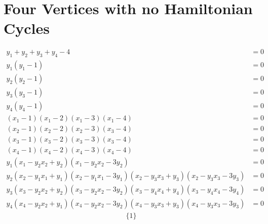 \documentclass[letterpaper]{article}
\newcommand{\aln}[1]{\begin{align*} #1 \end{align*}} %
\begin{document}
\section{Four Vertices with no Hamiltonian Cycles}
\begin{center}
\end{center}
\aln{
	y_1 + y_2 + y_3 + y_4 - 4 &= 0\\
	y_1(y_1 - 1) &= 0\\
	y_2(y_2 - 1) &= 0\\
	y_3(y_3 - 1) &= 0\\
	y_4(y_4 - 1) &= 0\\
	(x_1 - 1)(x_1 - 2)(x_1 - 3)(x_1 - 4) &= 0\\
	(x_2 - 1)(x_2 - 2)(x_2 - 3)(x_3 - 4) &= 0\\
	(x_3 - 1)(x_3 - 2)(x_3 - 3)(x_3 - 4) &= 0\\
	(x_4 - 1)(x_4 - 2)(x_4 - 3)(x_4 - 4) &= 0\\
	y_1 (x_1 - y_2 x_2 + y_2)(x_1 - y_2 x_2 - 3y_2) &= 0\\
	y_2 (x_2 - y_1 x_1 + y_1)(x_2 - y_1 x_1 - 3y_1)(x_2 - y_3 x_3 + y_3)(x_2 - y_3 x_3 - 3y_3) &= 0\\
	y_3 (x_3 - y_2 x_2 + y_2)(x_3 - y_2 x_2 - 3y_2)(x_3 - y_4 x_4 + y_4)(x_3 - y_4 x_4 - 3y_4) &= 0\\
	y_4 (x_4 - y_2 x_2 + y_1)(x_4 - y_2 x_2 - 3y_2)(x_4 - y_3 x_3 + y_3)(x_4 - y_3 x_3 - 3y_3) &= 0
}
\aln{
	\{1\}
}


\newpage
\end{document}
